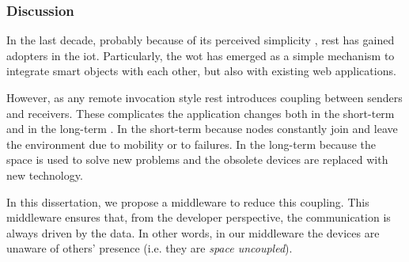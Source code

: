 \subsubsection{Discussion}


In the last decade, probably because of its perceived simplicity \citep{guinard_search_2011}, \ac{rest} has gained adopters in the \ac{iot}.
Particularly, the \ac{wot} has emerged as a simple mechanism to integrate smart objects with each other, but also with existing web applications.

However, as any remote invocation style \ac{rest} introduces coupling between senders and receivers.
These complicates the application changes both in the short-term and in the long-term \citep{johanson_extending_2004}.
In the short-term because nodes constantly join and leave the environment due to mobility or to failures.
In the long-term because the space is used to solve new problems and the obsolete devices are replaced with new technology.

In this dissertation, we propose a middleware to reduce this coupling.
This middleware ensures that, from the developer perspective, the communication is always driven by the data.
In other words, in our middleware the devices are unaware of others' presence (i.e. they are \emph{space uncoupled}).